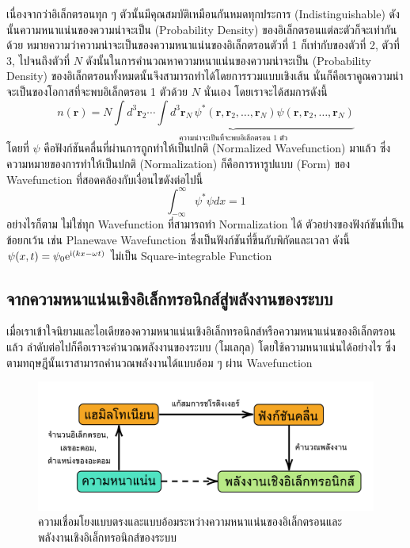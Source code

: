 เนื่องจากว่าอิเล็กตรอนทุก ๆ ตัวนั้นมีคุณสมบัติเหมือนกันหมดทุกประการ (Indistinguishable) ดังนั้นความหนาแน่นของความน่าจะเป็น (Probability Density) ของอิเล็กตรอนแต่ละตัวก็จะเท่ากันด้วย หมายความว่าความน่าจะเป็นของความหนาแน่นของอิเล็กตรอนตัวที่ 1 ก็เท่ากับของตัวที่ 2, ตัวที่ 3, ไปจนถึงตัวที่ $N$ ดังนั้นในการคำนวณหาความหนาแน่นของความน่าจะเป็น (Probability Density) ของอิเล็กตรอนทั้งหมดนั้นจึงสามารถทำได้โดยการรวมแบบเชิงเส้น นั่นก็คือเราคูณความน่าจะเป็นของโอกาสที่จะพบอิเล็กตรอน 1 ตัวด้วย $N$ นั่นเอง โดยเราจะได้สมการดังนี้
%
\begin{equation}\label{eq:elec_density_all}
    n(\bm{r}) = N \underbrace{\int {d}^{3} \bm{r}_{2} \cdots \int {d}^{3} \bm{r}_{N} \,
        \psi^*(\bm{r}, \bm{r}_{2}, \dots, \bm{r}_{N}) \psi(\bm{r}, \bm{r}_2,
        \dots, \bm{r}_N)}_{\textstyle \text{ความน่าจะเป็นที่จะพบอิเล็กตรอน 1 ตัว}}
\end{equation}
%
\noindent โดยที่ $\psi$ คือฟังก์ชันคลื่นที่ผ่านการถูกทำให้เป็นปกติ (Normalized Wavefunction) มาแล้ว ซึ่งความหมายของการทำให้เป็นปกติ (Normalization) ก็คือการหารูปแบบ (Form) ของ Wavefunction ที่สอดคล้องกับเงื่อนไขดังต่อไปนี้
%
\begin{equation}\label{eq:square_integrable}
    \int^\infty_{-\infty} \psi^* \psi dx = 1
\end{equation}
%
อย่างไรก็ตาม ไม่ใช่ทุก Wavefunction ที่สามารถทำ Normalization ได้ ตัวอย่างของฟังก์ชันที่เป็นข้อยกเว้น เช่น Planewave Wavefunction ซึ่งเป็นฟังก์ชันที่ขึ้นกับพิกัดและเวลา ดังนี้ $\psi(x,t) = \psi_0 {\rm e}^{ {\rm i} (k x-\omega t)}$ ไม่เป็น Square-integrable Function

\subsection{จากความหนาแน่นเชิงอิเล็กทรอนิกส์สู่พลังงานของระบบ}
\label{ssec:ener_density}

เมื่อเราเข้าใจนิยามและไอเดียของความหนาแน่นเชิงอิเล็กทรอนิกส์หรือความหนาแน่นของอิเล็กตรอนแล้ว ลำดับต่อไปก็คือเราจะคำนวณพลังงานของระบบ (โมเลกุล) โดยใช้ความหนาแน่นได้อย่างไร ซึ่งตามทฤษฎีนั้นเราสามารถคำนวณพลังงานได้แบบอ้อม ๆ ผ่าน Wavefunction

\begin{figure}[H]
    \centering
    \includegraphics[width=0.85\linewidth]{fig/density_wavefunc_ener.png}
    \caption{ความเชื่อมโยงแบบตรงและแบบอ้อมระหว่างความหนาแน่นของอิเล็กตรอนและพลังงานเชิงอิเล็กทรอนิกส์ของระบบ}
    \label{fig:density_wavefunc_ener}
\end{figure}

